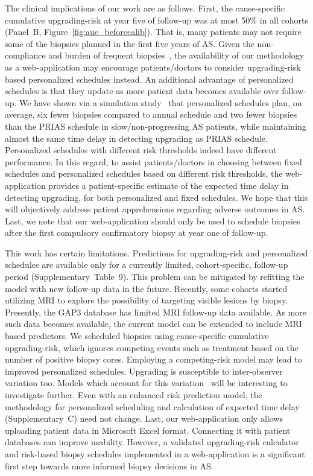 The clinical implications of our work are as follows. First, the cause-specific cumulative upgrading-risk at year five of follow-up was at most 50\% in all cohorts (Panel~B, Figure~\ref{fig:auc_beforecalib}). That is, many patients may not require some of the biopsies planned in the first five years of AS. Given the non-compliance and burden of frequent biopsies~\citep{bokhorst2015compliance}, the availability of our methodology as a web-application may encourage patients/doctors to consider upgrading-risk based personalized schedules instead. An additional advantage of personalized schedules is that they update as more patient data becomes available over follow-up. We have shown via a simulation study~\citep{tomer2019personalized} that personalized schedules plan, on average, six fewer biopsies compared to annual schedule and two fewer biopsies than the PRIAS schedule in slow/non-progressing AS patients, while maintaining almost the same time delay in detecting upgrading as PRIAS schedule. Personalized schedules with different risk thresholds indeed have different performance. In this regard, to assist patients/doctors in choosing between fixed schedules and personalized schedules based on different risk thresholds, the web-application provides a patient-specific estimate of the expected time delay in detecting upgrading, for both personalized and fixed schedules. We hope that this will objectively address patient apprehensions regarding adverse outcomes in AS. Last, we note that our web-application should only be used to schedule biopsies after the first compulsory confirmatory biopsy at year one of follow-up.

This work has certain limitations. Predictions for upgrading-risk and personalized schedules are available only for a currently limited, cohort-specific, follow-up period (Supplementary~Table~9). This problem can be mitigated by refitting the model with new follow-up data in the future. Recently, some cohorts started utilizing MRI to explore the possibility of targeting visible lesions by biopsy. Presently, the GAP3 database has limited MRI follow-up data available. As more such data becomes available, the current model can be extended to include MRI based predictors. We scheduled biopsies using cause-specific cumulative upgrading-risk, which ignores competing events such as treatment based on the number of positive biopsy cores. Employing a competing-risk model may lead to improved personalized schedules. Upgrading is susceptible to inter-observer variation too. Models which account for this variation~\citep{coley2017prediction,balasubramanian2003estimation} will be interesting to investigate further. Even with an enhanced risk prediction model, the methodology for personalized scheduling and calculation of expected time delay (Supplementary~C) need not change. Last, our web-application only allows uploading patient data in Microsoft Excel format. Connecting it with patient databases can improve usability. However, a validated upgrading-risk calculator and risk-based biopsy schedules implemented in a web-application is a significant first step towards more informed biopsy decisions in AS.